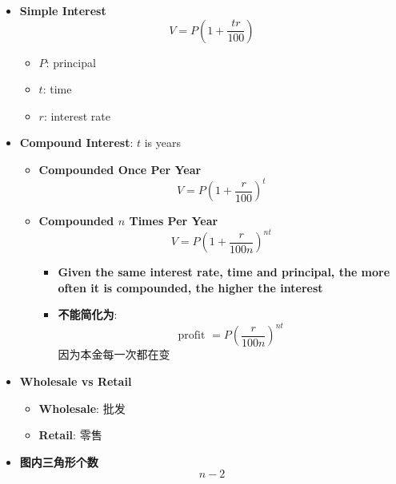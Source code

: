 \begin{multicols}{2}
\begin{itemize}
    \item \textbf{Simple Interest}
    \begin{equation}
      V = P \left( 1 + \frac{tr}{100} \right)
    \end{equation}

    \begin{itemize}
      \item $ P $: principal
      \item $ t $: time
      \item $ r $: interest rate
    \end{itemize}

    \item \textbf{Compound Interest}: $ t $ is years
    \begin{itemize}
      \item \textbf{Compounded Once Per Year}
      \begin{equation}
        V = P \left( 1 + \frac{r}{100} \right)^{t}
      \end{equation}

      \item \textbf{Compounded $ n $ Times Per Year}
      \begin{equation}
        V = P \left( 1 + \frac{r}{100n} \right)^{nt}
      \end{equation}
      \begin{itemize}
        \item \textbf{Given the same interest rate, time and principal, the more
        often it is compounded, the higher the interest}
        \item \textbf{不能简化为}:
        \begin{equation}
          \text{profit } = P \left( \frac{r}{100n} \right)^{nt}
        \end{equation}
        因为本金每一次都在变
      \end{itemize}
    \end{itemize}

    \item \textbf{Wholesale vs Retail}
    \begin{itemize}
      \item \textbf{Wholesale}: 批发
      \item \textbf{Retail}: 零售
    \end{itemize}

    \item \textbf{图内三角形个数}
    \begin{equation}
      n - 2
    \end{equation}


\end{itemize}
\end{multicols}

